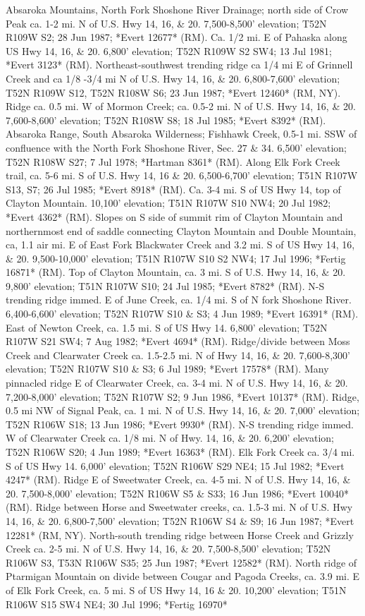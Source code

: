 Absaroka Mountains, North Fork Shoshone River Drainage; north side of Crow Peak ca. 1-2 mi. N of U.S. Hwy 14, 16, \& 20. 7,500-8,500’ elevation; T52N R109W S2; 28 Jun 1987; *Evert 12677* (RM).  Ca. 1/2 mi. E of Pahaska along US Hwy 14, 16, \& 20. 6,800’ elevation; T52N R109W S2 SW4; 13 Jul 1981; *Evert 3123* (RM).  Northeast-southwest trending ridge ca 1/4 mi E of Grinnell Creek and ca 1/8 -3/4 mi N of U.S. Hwy 14, 16, \& 20. 6,800-7,600’ elevation; T52N R109W S12, T52N R108W S6; 23 Jun 1987; *Evert 12460* (RM, NY).  Ridge ca. 0.5 mi. W of Mormon Creek; ca. 0.5-2 mi. N of U.S. Hwy 14, 16, \& 20. 7,600-8,600’ elevation; T52N R108W S8; 18 Jul 1985; *Evert 8392* (RM).  Absaroka Range, South Absaroka Wilderness; Fishhawk Creek, 0.5-1 mi. SSW of confluence with the North Fork Shoshone River, Sec. 27 \& 34. 6,500’ elevation; T52N R108W S27; 7 Jul 1978; *Hartman 8361* (RM).  Along Elk Fork Creek trail, ca. 5-6 mi. S of U.S. Hwy 14, 16 \& 20. 6,500-6,700’ elevation; T51N R107W S13, S7; 26 Jul 1985; *Evert 8918* (RM).  Ca. 3-4 mi. S of US Hwy 14, top of Clayton Mountain. 10,100’ elevation; T51N R107W S10 NW4; 20 Jul 1982; *Evert 4362* (RM).  Slopes on S side of summit rim of Clayton Mountain and northernmost end of saddle connecting Clayton Mountain and Double Mountain, ca, 1.1 air mi. E of East Fork Blackwater Creek and 3.2 mi. S of US Hwy 14, 16, \& 20. 9,500-10,000’ elevation; T51N R107W S10 S2 NW4; 17 Jul 1996; *Fertig 16871* (RM).  Top of Clayton Mountain, ca. 3 mi. S of U.S. Hwy 14, 16, \& 20. 9,800’ elevation; T51N R107W S10; 24 Jul 1985; *Evert 8782* (RM).  N-S trending ridge immed. E of June Creek, ca. 1/4 mi. S of N fork Shoshone River. 6,400-6,600’ elevation; T52N R107W S10 \& S3; 4 Jun 1989; *Evert 16391* (RM).  East of Newton Creek, ca. 1.5 mi. S of US Hwy 14. 6,800’ elevation; T52N R107W S21 SW4; 7 Aug 1982; *Evert 4694* (RM).  Ridge/divide between Moss Creek and Clearwater Creek ca. 1.5-2.5 mi. N of Hwy 14, 16, \& 20. 7,600-8,300’ elevation; T52N R107W S10 \& S3; 6 Jul 1989; *Evert 17578* (RM).  Many pinnacled ridge E of Clearwater Creek, ca. 3-4 mi. N of U.S. Hwy 14, 16, \& 20. 7,200-8,000’ elevation; T52N R107W S2; 9 Jun 1986, *Evert 10137* (RM).  Ridge, 0.5 mi NW of Signal Peak, ca. 1 mi. N of U.S. Hwy 14, 16, \& 20. 7,000’ elevation; T52N R106W S18; 13 Jun 1986; *Evert 9930* (RM).  N-S trending ridge immed. W of Clearwater Creek ca. 1/8 mi. N of Hwy. 14, 16, \& 20. 6,200’ elevation; T52N R106W S20; 4 Jun 1989; *Evert 16363* (RM).  Elk Fork Creek ca. 3/4 mi. S of US Hwy 14. 6,000’ elevation; T52N R106W S29 NE4; 15 Jul 1982; *Evert 4247* (RM).  Ridge E of Sweetwater Creek, ca. 4-5 mi. N of U.S. Hwy 14, 16, \& 20. 7,500-8,000’ elevation;  T52N R106W S5 \& S33; 16 Jun 1986; *Evert 10040* (RM).  Ridge between Horse and Sweetwater creeks, ca. 1.5-3 mi. N of U.S. Hwy 14, 16, \& 20. 6,800-7,500’ elevation; T52N R106W S4 \& S9; 16 Jun 1987; *Evert 12281* (RM, NY).  North-south trending ridge between Horse Creek and Grizzly Creek ca. 2-5 mi. N of U.S. Hwy 14, 16, \& 20. 7,500-8,500’ elevation; T52N R106W S3, T53N R106W S35; 25 Jun 1987; *Evert 12582* (RM).  North ridge of Ptarmigan Mountain on divide between Cougar and Pagoda Creeks, ca. 3.9 mi. E of Elk Fork Creek, ca. 5 mi. S of US Hwy 14, 16 \& 20. 10,200’ elevation; T51N R106W S15 SW4 NE4; 30 Jul 1996; *Fertig 16970* 